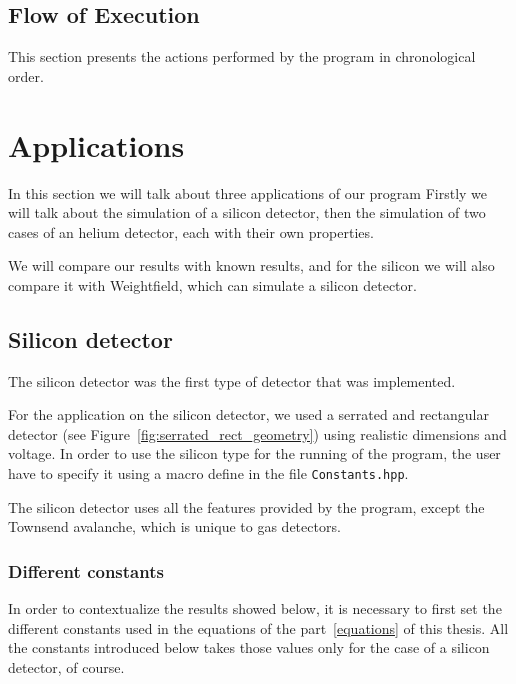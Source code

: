 \documentclass[11pt]{article}
\begin{document}
	\subsection{Flow of Execution}

		This section presents the actions performed by the program in chronological
		order.




\section{Applications}

	In this section we will talk about three applications of our program
	Firstly we will talk about the simulation of a silicon detector, then the
	simulation of two cases of an helium detector, each with their own properties.

	We will compare our results with known results, and for the silicon we will also
	compare it with Weightfield, which can simulate a silicon detector.

	\subsection{Silicon detector}

		The silicon detector was the first type of detector that was implemented.

		For the application on the silicon detector, we used a serrated and rectangular detector
		(see Figure~\ref{fig:serrated_rect_geometry}) using realistic dimensions and voltage.
		In order to use the silicon type for the running of the program, the user have to specify
		it using a macro define in the file \texttt{Constants.hpp}.

		The silicon detector uses all the features provided by the program, except the Townsend
		avalanche, which is unique to gas detectors.

		\subsubsection*{Different constants}

			In order to contextualize the results showed below, it is necessary to first set the
			different constants used in the equations of the part~\ref{equations} of this thesis.
			All the constants introduced below takes those values only for the case of a silicon
			detector, of course.
\end{document}
